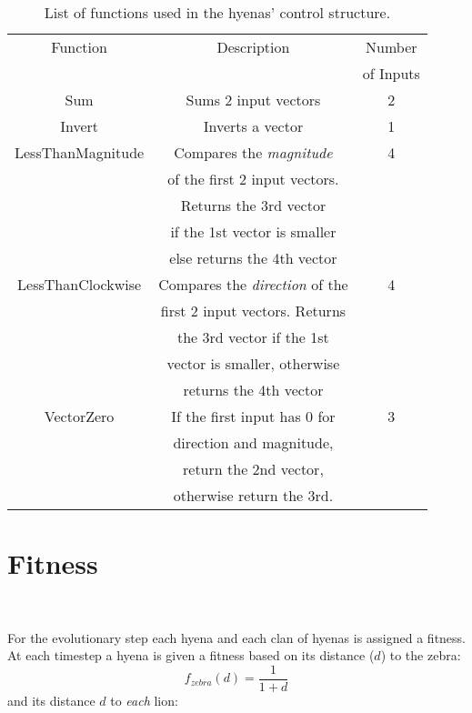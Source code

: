 \documentclass{article}
\begin{document}
\begin{table}[t]
\centering
\begin{tabular}{|c|c|c|}
\hline
Function			& Description	& Number \\
					&				& of Inputs \\
\hline
\hline
Sum					& Sums 2 input vectors & 2 \\
\hline
Invert				& Inverts a vector & 1 \\
\hline
LessThanMagnitude & Compares the \textit{magnitude} & 4 \\
                  & of the first 2 input vectors.  & \\
                  & Returns the 3rd vector & \\
                  & if the 1st vector is smaller & \\
                  & else returns the 4th vector & \\
\hline
LessThanClockwise & Compares the \textit{direction} of the & 4 \\
                  & first 2 input vectors. Returns & \\
                  & the 3rd vector if the 1st & \\
                  & vector is smaller, otherwise & \\
                  & returns the 4th vector & \\
\hline 
VectorZero			& If the first input has 0 for & 3 \\
                  & direction and magnitude, & \\
                  & return the 2nd vector, & \\
                  & otherwise return the 3rd. & \\
\hline
\end{tabular}
\caption{List of functions used in the hyenas' control structure. }
\label{tab:hyenaFunctions}
\end{table}


\section{Fitness}~\label{sec:fitness}

For the evolutionary step each hyena and each clan of hyenas is assigned a fitness. At each timestep a hyena is given a fitness based on its distance ($d$) to the zebra:
\begin{equation}
f_{zebra}(d) = \frac{1}{1+d}
\end{equation}
and its distance $d$ to \textit{each} lion:
\end{document}
